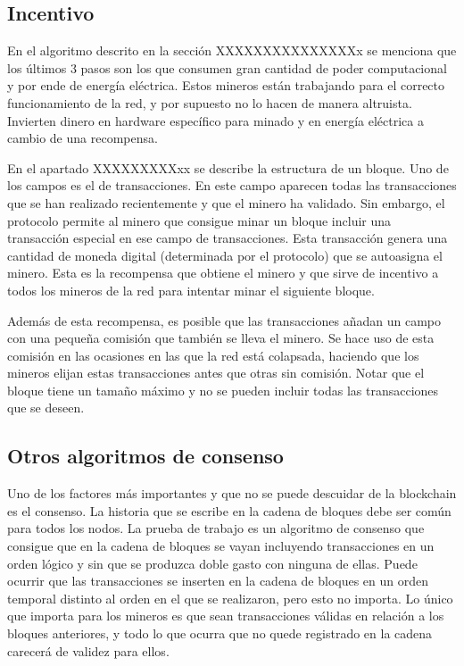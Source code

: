 \subsection{Incentivo}

En el algoritmo descrito en la sección XXXXXXXXXXXXXXXx se menciona que los últimos 3 pasos son los que consumen gran cantidad de poder computacional y por ende de energía eléctrica. Estos mineros están trabajando para el correcto funcionamiento de la red, y por supuesto no lo hacen de manera altruista. Invierten dinero en hardware específico para minado y en energía eléctrica a cambio de una recompensa. \newline

En el apartado XXXXXXXXXxx se describe la estructura de un bloque. Uno de los campos es el de transacciones. En este campo aparecen todas las transacciones que se han realizado recientemente y que el minero ha validado. Sin embargo, el protocolo permite al minero que consigue minar un bloque incluir una transacción especial en ese campo de transacciones. Esta transacción genera una cantidad de moneda digital (determinada por el protocolo) que se autoasigna el minero. Esta es la recompensa que obtiene el minero y que sirve de incentivo a todos los mineros de la red para intentar minar el siguiente bloque. \newline

Además de esta recompensa, es posible que las transacciones añadan un campo con una pequeña comisión que también se lleva el minero. Se hace uso de esta comisión en las ocasiones en las que la red está colapsada, haciendo que los mineros elijan estas transacciones antes que otras sin comisión. Notar que el bloque tiene un tamaño máximo y no se pueden incluir todas las transacciones que se deseen.


\subsection{Otros algoritmos de consenso}

Uno de los factores más importantes y que no se puede descuidar de la blockchain es el consenso. La historia que se escribe en la cadena de bloques debe ser común para todos los nodos. La prueba de trabajo es un algoritmo de consenso que consigue que en la cadena de bloques se vayan incluyendo transacciones en un orden lógico y sin que se produzca doble gasto con ninguna de ellas. Puede ocurrir que las transacciones se inserten en la cadena de bloques en un orden temporal distinto al orden en el que se realizaron, pero esto no importa. Lo único que importa para los mineros es que sean transacciones válidas en relación a los bloques anteriores, y todo lo que ocurra que no quede registrado en la cadena carecerá de validez para ellos. \newline

